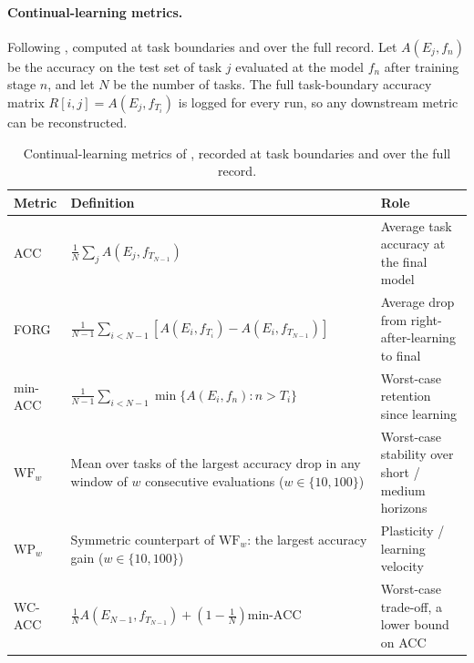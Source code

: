 \paragraph{Continual-learning metrics.} Following \citet{delange2023continualevaluationlifelonglearning}, computed at task boundaries and over the full record. Let $A(E_j, f_n)$ be the accuracy on the test set of task $j$ evaluated at the model $f_n$ after training stage $n$, and let $N$ be the number of tasks. The full task-boundary accuracy matrix $R[i,j] = A(E_j, f_{T_i})$ is logged for every run, so any downstream metric can be reconstructed.

\begin{table}[H]
    \centering
    \small
    \begin{tabular}{@{}p{1.8cm} p{8.5cm} p{4.3cm}@{}}
        \hline
        Metric          & Definition                                                                                                      & Role                                              \\
        \hline
        ACC             & $\frac{1}{N} \sum_j A(E_j, f_{T_{N-1}})$                                                                        & Average task accuracy at the final model          \\
        FORG            & $\frac{1}{N-1} \sum_{i<N-1} \left[ A(E_i, f_{T_i}) - A(E_i, f_{T_{N-1}}) \right]$                               & Average drop from right-after-learning to final   \\
        min-ACC         & $\frac{1}{N-1} \sum_{i<N-1} \min\{ A(E_i, f_n) : n > T_i \}$                                                    & Worst-case retention since learning               \\
        $\mathrm{WF}_w$ & Mean over tasks of the largest accuracy drop in any window of $w$ consecutive evaluations ($w \in \{10, 100\}$) & Worst-case stability over short / medium horizons \\
        $\mathrm{WP}_w$ & Symmetric counterpart of $\mathrm{WF}_w$: the largest accuracy gain ($w \in \{10, 100\}$)                       & Plasticity / learning velocity                    \\
        WC-ACC          & $\frac{1}{N} A(E_{N-1}, f_{T_{N-1}}) + \left(1 - \frac{1}{N}\right)\text{min-ACC}$                              & Worst-case trade-off, a lower bound on ACC     \\
        \hline
    \end{tabular}
    \caption{Continual-learning metrics of \citet{delange2023continualevaluationlifelonglearning}, recorded at task boundaries and over the full record.}
    \label{tab:cl_metrics}
\end{table}

